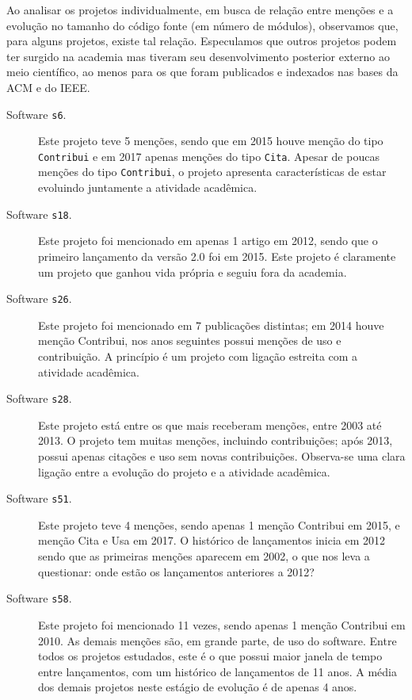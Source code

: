 Ao analisar os projetos individualmente, em busca de relação entre
menções e a evolução no tamanho do código fonte (em número de módulos), 
observamos que, para alguns projetos, existe tal relação.
Especulamos que outros projetos podem ter surgido na academia mas 
tiveram seu desenvolvimento posterior externo ao meio científico, 
ao menos para os que foram publicados e indexados nas bases da ACM e do IEEE.


\begin{description}

  \item[Software \texttt{s6}.]
    Este projeto teve 5 menções, sendo que em 2015 houve menção do tipo \texttt{Contribui} 
    e em 2017 apenas menções do tipo \texttt{Cita}. 
    Apesar de poucas menções do tipo \texttt{Contribui},
    o projeto apresenta características de estar evoluindo juntamente a atividade
    acadêmica.

  \item[Software \texttt{s18}.]
    Este projeto foi mencionado em apenas 1 artigo em 2012, sendo que o
    primeiro lançamento da versão 2.0 foi em 2015. Este projeto é claramente um
    projeto que ganhou vida própria e seguiu fora da academia.

  \item[Software \texttt{s26}.]
    Este projeto foi mencionado em 7 publicações distintas; em 2014 houve
    menção Contribui, nos anos seguintes possui menções de uso e contribuição.
    A princípio é um projeto com ligação estreita com a atividade acadêmica.

  \item[Software \texttt{s28}.]
    Este projeto está entre os que mais receberam menções, entre 2003 até 2013.
    O projeto tem muitas menções, incluindo contribuições; após 2013, possui apenas
    citações e uso sem novas contribuições. Observa-se uma clara ligação
    entre a evolução do projeto e a atividade acadêmica.

  \item[Software \texttt{s51}.]
    Este projeto teve 4 menções, sendo apenas 1 menção Contribui em 2015,
    e menção Cita e Usa em 2017. O histórico de lançamentos inicia em 2012
    sendo que as primeiras menções aparecem em 2002, o que nos leva a
    questionar: onde estão os lançamentos anteriores a 2012?

  \item[Software \texttt{s58}.]
    Este projeto foi mencionado 11 vezes, sendo apenas 1 menção Contribui em 2010.
    As demais menções são, em grande parte, de uso do software. 
    Entre todos os projetos estudados, este é o que possui maior janela de tempo entre lançamentos, 
    com um histórico de lançamentos de 11 anos. A média dos demais  projetos neste estágio de evolução
    é de apenas 4 anos.

\end{description}

